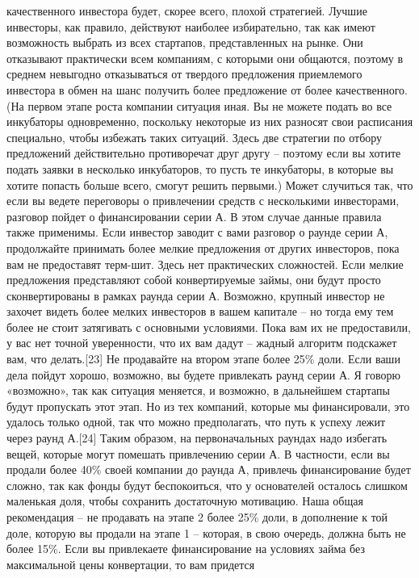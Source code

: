 \documentclass[ebook,12pt,oneside,openany]{memoir}
\begin{document}
качественного инвестора будет, скорее всего, плохой стратегией. Лучшие
инвесторы, как правило, действуют наиболее избирательно, так как имеют
возможность выбрать из всех стартапов, представленных на рынке. Они
отказывают практически всем компаниям, с которыми они общаются,
поэтому в среднем невыгодно отказываться от твердого предложения
приемлемого инвестора в обмен на шанс получить более предложение от
более качественного. (На первом этапе роста компании ситуация иная. Вы
не можете подать во все инкубаторы одновременно, поскольку некоторые
из них разносят свои расписания специально, чтобы избежать таких
ситуаций. Здесь две стратегии по отбору предложений действительно
противоречат друг другу – поэтому если вы хотите подать заявки в
несколько инкубаторов, то пусть те инкубаторы, в которые вы хотите
попасть больше всего, смогут решить первыми.) Может случиться так, что
если вы ведете переговоры о привлечении средств с несколькими
инвесторами, разговор пойдет о финансировании серии А. В этом случае
данные правила также применимы. Если инвестор заводит с вами разговор
о раунде серии А, продолжайте принимать более мелкие предложения от
других инвесторов, пока вам не предоставят терм-шит. Здесь нет
практических сложностей. Если мелкие предложения представляют собой
конвертируемые займы, они будут просто сконвертированы в рамках раунда
серии А. Возможно, крупный инвестор не захочет видеть более мелких
инвесторов в вашем капитале – но тогда ему тем более не стоит
затягивать с основными условиями. Пока вам их не предоставили, у вас
нет точной уверенности, что их вам дадут – жадный алгоритм подскажет
вам, что делать.[23] Не продавайте на втором этапе более 25\% доли.
Если ваши дела пойдут хорошо, возможно, вы будете привлекать раунд
серии А. Я говорю «возможно», так как ситуация меняется, и возможно, в
дальнейшем стартапы будут пропускать этот этап. Но из тех компаний,
которые мы финансировали, это удалось только одной, так что можно
предполагать, что путь к успеху лежит через раунд А.[24] Таким
образом, на первоначальных раундах надо избегать вещей, которые могут
помешать привлечению серии А. В частности, если вы продали более 40\%
своей компании до раунда А, привлечь финансирование будет сложно, так
как фонды будут беспокоиться, что у основателей осталось слишком
маленькая доля, чтобы сохранить достаточную мотивацию. Наша общая
рекомендация – не продавать на этапе 2 более 25\% доли, в дополнение к
той доле, которую вы продали на этапе 1 – которая, в свою очередь,
должна быть не более 15\%. Если вы привлекаете финансирование на
условиях займа без максимальной цены конвертации, то вам придется
\end{document}
